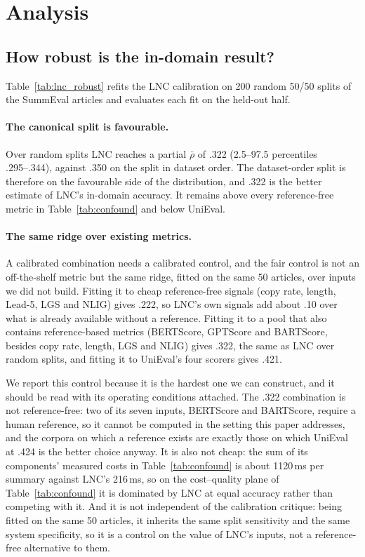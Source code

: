 \section{Analysis}
\label{sec:analysis}

\subsection{How robust is the in-domain result?}

Table~\ref{tab:lnc_robust} refits the LNC calibration on 200 random 50/50 splits of the SummEval articles and evaluates each fit on the held-out half.

\paragraph{The canonical split is favourable.} Over random splits LNC reaches a partial $\bar\rho$ of .322 (2.5--97.5 percentiles .295--.344), against .350 on the split in dataset order. The dataset-order split is therefore on the favourable side of the distribution, and .322 is the better estimate of LNC's in-domain accuracy. It remains above every reference-free metric in Table~\ref{tab:confound} and below UniEval.

\paragraph{The same ridge over existing metrics.} A calibrated combination needs a calibrated control, and the fair control is not an off-the-shelf metric but the same ridge, fitted on the same 50 articles, over inputs we did not build. Fitting it to cheap reference-free signals (copy rate, length, Lead-5, LGS and NLIG) gives .222, so LNC's own signals add about .10 over what is already available without a reference. Fitting it to a pool that also contains reference-based metrics (BERTScore, GPTScore and BARTScore, besides copy rate, length, LGS and NLIG) gives .322, the same as LNC over random splits, and fitting it to UniEval's four scorers gives .421.

We report this control because it is the hardest one we can construct, and it should be read with its operating conditions attached. The .322 combination is not reference-free: two of its seven inputs, BERTScore and BARTScore, require a human reference, so it cannot be computed in the setting this paper addresses, and the corpora on which a reference exists are exactly those on which UniEval at .424 is the better choice anyway. It is also not cheap: the sum of its components' measured costs in Table~\ref{tab:confound} is about 1120\,ms per summary against LNC's 216\,ms, so on the cost--quality plane of Table~\ref{tab:confound} it is dominated by LNC at equal accuracy rather than competing with it. And it is not independent of the calibration critique: being fitted on the same 50 articles, it inherits the same split sensitivity and the same system specificity, so it is a control on the value of LNC's inputs, not a reference-free alternative to them.


